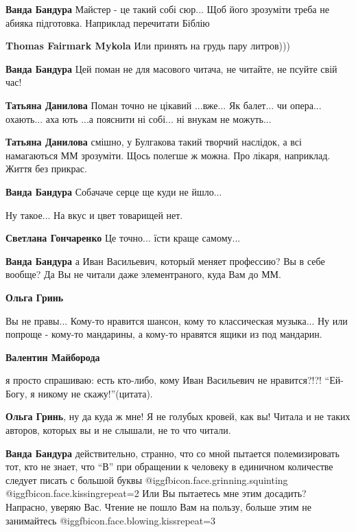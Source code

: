 \begin{itemize}
\begin{itemize} %
\textbf{Ванда Бандура} Майстер - це такий собі сюр... Щоб його зрозуміти треба не абияка підготовка. Наприклад перечитати Біблію

\textbf{Thomas Fairmark Mykola} Или принять на грудь пару литров)))

\textbf{Ванда Бандура} Цей поман не для масового читача, не читайте, не псуйте свій час!

\begin{itemize} %
\textbf{Татьяна Данилова}
Поман точно не цікавий ...вже...
Як балет... чи опера... охають... аха
ють ...а пояснити ні собі... ні внукам не можуть...

\textbf{Татьяна Данилова} смішно, у Булгакова такий творчий наслідок, а всі намагаються ММ зрозуміти. Щось полегше ж можна. Про лікаря, наприклад. Життя без прикрас.
\end{itemize} %

\textbf{Ванда Бандура}
Собачаче серце ще куди не йшло...

Ну такое... На вкус и цвет товарищей нет.

\textbf{Светлана Гончаренко}
Це точно... їсти краще самому...

\textbf{Ванда Бандура} а Иван Васильевич, который меняет профессию? Вы в себе вообще? Да Вы не читали даже элементраного, куда Вам до ММ.

\begin{itemize} %
\textbf{Ольга Гринь} 

Вы не правы... Кому-то нравится шансон, кому то классическая музыка... Ну или
попроще - кому-то мандарины, а кому-то нравятся ящики из под мандарин.

\textbf{Валентин Майборода} 

я просто спрашиваю: есть кто-либо, кому Иван Васильевич не нравится?!?!
\enquote{Ей-Богу, я никому не скажу!}(цитата).

\textbf{Ольга Гринь}, ну да куда ж мне! Я не голубых кровей, как вы! Читала и не таких авторов, которых вы и не слышали, не то что читали.

\textbf{Ванда Бандура} действительно, странно, что со мной пытается полемизировать тот, кто не знает, что \enquote{В} при обращении к человеку в единичном количестве следует писать с большой буквы @igg{fbicon.face.grinning.squinting}  @igg{fbicon.face.kissing}{repeat=2}  Или Вы пытаетесь мне этим досадить? Напрасно, уверяю Вас. Чтение не пошло Вам на пользу, больше этим не занимайтесь @igg{fbicon.face.blowing.kiss}{repeat=3} 


\end{itemize}
\end{itemize}
\end{itemize}
